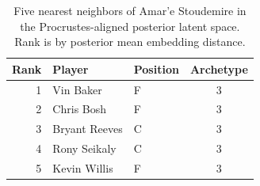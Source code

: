\begin{table}[htbp]
  \centering\small
  \begin{tabular}{rllc}
    \toprule
    Rank & Player & Position & Archetype \\
    \midrule
    1 & Vin Baker & F & 3 \\
    2 & Chris Bosh & F & 3 \\
    3 & Bryant Reeves & C & 3 \\
    4 & Rony Seikaly & C & 3 \\
    5 & Kevin Willis & F & 3 \\
    \bottomrule
  \end{tabular}
  \caption{Five nearest neighbors of Amar'e Stoudemire in the Procrustes-aligned posterior latent space. Rank is by posterior mean embedding distance.}
  \label{tab:Amar_e_Stoudemire_neighbors}
\end{table}

